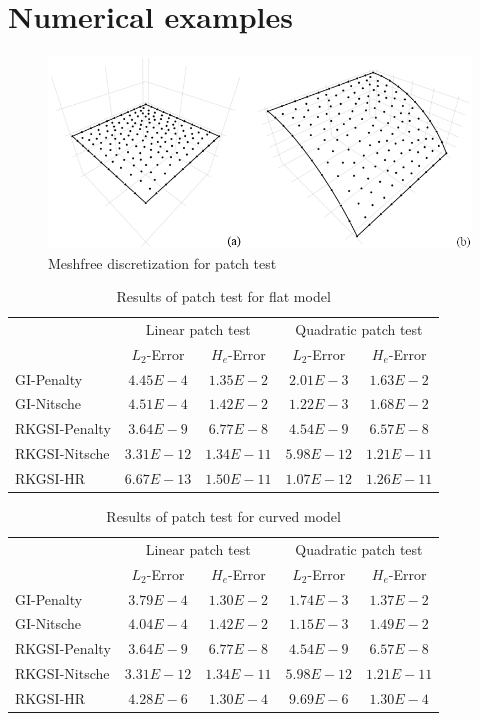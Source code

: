 
\section{Numerical examples}
\begin{figure}[h!]
    \centering
    \includegraphics[width=\textwidth]{figures/patchtest_msh}
    \caption{Meshfree discretization for patch test}

\end{figure}

\begin{table}[h!]
\centering
\caption{Results of patch test for flat model}
\begin{tabular}{lcccc}
\toprule
 & \multicolumn{2}{c}{Linear patch test} & \multicolumn{2}{c}{Quadratic patch test} \\ \cline{2-5}
 & $L_2$-Error & $H_e$-Error & $L_2$-Error & $H_e$-Error \\
    \midrule
    GI-Penalty & $4.45E-4$ & $1.35E-2$ & $2.01E-3$ & $1.63E-2$ \\
    GI-Nitsche & $4.51E-4$ & $1.42E-2$ & $1.22E-3$ & $1.68E-2$ \\
    RKGSI-Penalty & $3.64E-9$ & $6.77E-8$ & $4.54E-9$ & $6.57E-8$ \\
    RKGSI-Nitsche & $3.31E-12$ & $1.34E-11$ & $5.98E-12$ & $1.21E-11$ \\
    RKGSI-HR & $6.67E-13$ & $1.50E-11$ & $1.07E-12$ & $1.26E-11$ \\
    \bottomrule
\end{tabular}
\end{table}

\begin{table}[h!]
\centering
\caption{Results of patch test for curved model}
\begin{tabular}{lcccc}
\toprule
 & \multicolumn{2}{c}{Linear patch test} & \multicolumn{2}{c}{Quadratic patch test} \\ \cline{2-5}
 & $L_2$-Error & $H_e$-Error & $L_2$-Error & $H_e$-Error \\
    \midrule
    GI-Penalty & $3.79E-4$ & $1.30E-2$ & $1.74E-3$ & $1.37E-2$ \\
    GI-Nitsche & $4.04E-4$ & $1.42E-2$ & $1.15E-3$ & $1.49E-2$ \\
    RKGSI-Penalty & $3.64E-9$ & $6.77E-8$ & $4.54E-9$ & $6.57E-8$ \\
    RKGSI-Nitsche & $3.31E-12$ & $1.34E-11$ & $5.98E-12$ & $1.21E-11$ \\
    RKGSI-HR & $4.28E-6$ & $1.30E-4$ & $9.69E-6$ & $1.30E-4$ \\
    \bottomrule
\end{tabular}
\end{table}

